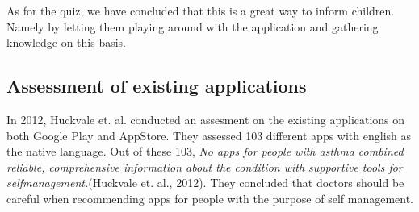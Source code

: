 As for the quiz, we have concluded that this is a great way to inform children. Namely by letting them playing around with the application and gathering knowledge on this basis. 

\subsection{Assessment of existing applications}
In 2012, Huckvale et. al. \cite{huckvale2012apps} conducted an assesment on the existing applications on both Google Play and AppStore. They assessed 103 different apps with english as the native language. Out of these 103, \emph{No apps for people with asthma combined reliable, comprehensive information about the condition with supportive tools for self­management.}(Huckvale et. al., 2012). They concluded that doctors should be careful when recommending apps for people with the purpose of self management. 




